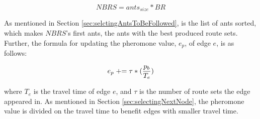 $$NBRS = ants_{size} * BR$$

As mentioned in Section \vref{sec:selctingAntsToBeFollowed}, is the list of ants sorted, which makes $NBRS$'s first ants, the ants with the best produced route sets.
Further, the formula for updating the pheromone value, $e_p$, of edge $e$, is as follows:

$$e_p \mathrel{+}= \tau*(\frac{p_b}{T_e})$$ 

where $T_e$ is the travel time of edge $e$, and $\tau$ is the number of route sets the edge appeared in. As mentioned in Section \vref{sec:selectingNextNode}, the pheromone value is divided on the travel time to benefit edges with smaller travel time. 